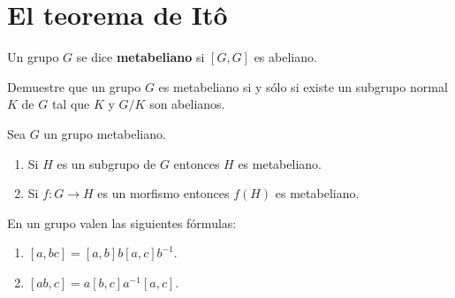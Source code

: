 \chapter{El teorema de It\^o}

\begin{definition}
	Un grupo $G$ se dice \textbf{metabeliano} si $[G,G]$ es abeliano. 
\end{definition}

\begin{exercise}
	Demuestre que un grupo $G$ es metabeliano si y sólo si existe un subgrupo
	normal $K$ de $G$ tal que $K$ y $G/K$ son abelianos.
\end{exercise}



\begin{exercise}
	Sea $G$ un grupo metabeliano. 
	\begin{enumerate}
		\item Si $H$ es un subgrupo de $G$ entonces $H$ es metabeliano.
		\item Si $f\colon G\to H$ es un morfismo entonces $f(H)$ es
			metabeliano.
	\end{enumerate}
\end{exercise}


\begin{lemma}
En un grupo valen las siguientes fórmulas:
\begin{enumerate}
	\item $[a,bc]=[a,b]b[a,c]b^{-1}$. 
	\item $[ab,c]=a[b,c]a^{-1}[a,c]$.
\end{enumerate}
\end{lemma}

